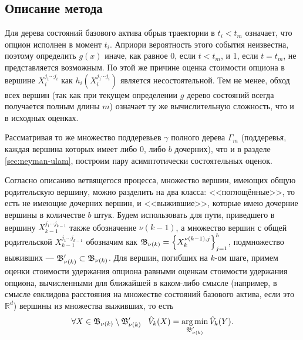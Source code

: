 \subsection{Описание метода}
Для дерева состояний базового актива обрыв траектории в $t_i < t_m$ означает, что опцион исполнен в момент $t_i$. Априори вероятность этого события неизвестна, поэтому определить $g(x)$ иначе, как равное 0, если $t < t_m$, и 1, если $t = t_m$, не представляется возможным. По этой же причине оценка стоимости опциона в вершине $X_i^{j_1\cdots j_i}$ как $h_i\left(X_i^{j_1\cdots j_i}\right)$ является несостоятельной. Тем не менее, обход всех вершин (так как при текущем определении $g$ дерево состояний всегда получается полным длины $m$) означает ту же вычислительную сложность, что и в исходных оценках.

Рассматривая то же множество поддеревьев $\gamma$ полного дерева $\Gamma_m$ (поддеревья, каждая вершина которых имеет либо 0, либо $b$ дочерних), что и в разделе \ref{sec:neyman-ulam}, построим пару асимптотически состоятельных оценок.

Согласно описанию ветвящегося процесса, множество вершин, имеющих общую родительскую вершину, можно разделить на два класса: <<поглощённые>>, то есть не имеющие дочерних вершин, и <<выжившие>>, которые имею дочерние вершины в количестве $b$ штук. Будем использовать для пути, приведшего в вершину $X_{k-1}^{j_1\cdots j_{k-1}}$ также обозначение $\nu(k-1)$, а множество вершин с общей родительской $X_{k-1}^{j_1\cdots j_{k-1}}$ обозначим как $\mathfrak{B}_{\nu(k)} = \left\lbrace X_k^{\nu(k-1), j} \right\rbrace_{j=1}^b$, подмножество выживших --- $\mathfrak{B}'_{\nu(k)}\subset\mathfrak{B}_{\nu(k)}$. Для вершин, погибших на $k$-ом шаге, примем оценки стоимости удержания опциона равными оценкам стоимости удержания опциона, вычисленными для ближайшей в каком-либо смысле (например, в смысле евклидова расстояния на множестве состояний базового актива, если это $\mathbb{R}^d$) вершины из множества выживших, то есть 
$$\forall X \in \mathfrak{B}_{\nu(k)}\setminus\mathfrak{B}'_{\nu(k)}\;\;\; \hat{V}_k(X) = \operatorname*{arg\,min}_{\mathfrak{B}'_{\nu(k)}} \hat{V}_k(Y).$$


